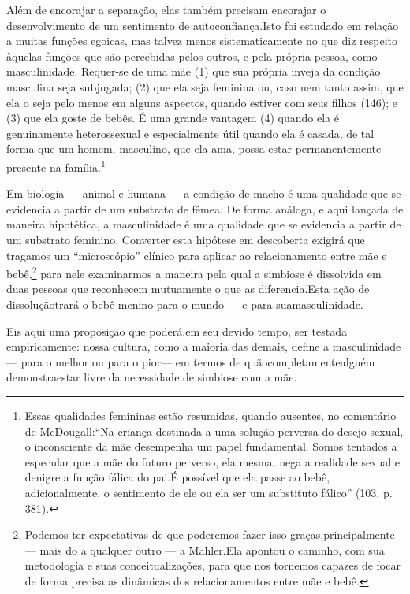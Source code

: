 Além de encorajar a separação, elas também precisam encorajar o
desenvolvimento de um sentimento de autoconfiança.\idxegoiauto[|(] Isto foi estudado em
relação a muitas funções egoicas, mas talvez menos sistematicamente no
que diz respeito àquelas funções que são percebidas pelos outros, e
pela própria pessoa, como masculinidade. Requer-se de uma mãe (1) que
sua própria inveja da condição masculina seja subjugada; (2) que ela
seja feminina\idxmascufem{} ou, caso nem tanto assim, que ela o seja pelo menos em
alguns aspectos, quando estiver com seus filhos (146); e (3) que ela
goste de bebês. É uma grande vantagem (4) quando ela é genuinamente
heterossexual e especialmente útil quando ela é casada, de tal forma
que um homem, masculino, que ela ama, possa estar permanentemente
presente na família.\footnote{ Essas qualidades femininas estão
resumidas, quando ausentes, no comentário de McDougall:\idxmcdoug[|nn]
``Na criança destinada a uma solução perversa do desejo
sexual, o inconsciente da mãe desempenha um papel fundamental. Somos
tentados a especular que a mãe do futuro perverso, ela mesma, nega a
realidade sexual e denigre a função fálica do pai.\idxmaesfalo[|nn] É possível que ela
passe ao bebê, adicionalmente, o sentimento de ele ou ela ser um
substituto fálico''\idxmaesfalo{} (103, p.\,381).}

Em biologia --- animal e humana --- a condição de macho é uma
qualidade que se evidencia a partir de um substrato de fêmea. De forma
análoga, e aqui lançada de maneira hipotética, a masculinidade é uma
qualidade que se evidencia a partir de um substrato feminino. Converter
esta hipótese em descoberta exigirá que tragamos um
``microscópio'' clínico para aplicar ao
relacionamento entre mãe e bebê,\footnote{ Podemos ter expectativas de
que poderemos fazer isso graças,\idxmaessimb[|nn] principalmente --- mais do a
qualquer outro --- a Mahler.\idxmahle[|nn] Ela apontou o caminho, com sua
metodologia e suas conceitualizações, para que nos tornemos capazes de
focar de forma precisa as dinâmicas dos relacionamentos entre mãe e
bebê.} para nele examinarmos a maneira pela qual a simbiose é
dissolvida em duas pessoas que reconhecem mutuamente o que as
diferencia.\idxinfanego[|)] Esta ação de dissolução\idxegoi[|)] trará o bebê menino para o mundo
--- e para sua\idxegoiauto[|)] masculinidade.

Eis aqui uma proposição que poderá,\idxmaesproc[|)] em seu devido tempo, ser testada
empiricamente: nossa cultura, como a maioria das demais, define a
masculinidade --- para o melhor ou para o pior\idxtranse[|)] --- em termos de quão\idxangus[|)]
completamente\idxangusimb[|)] alguém demonstra\idxmaessimb[|)] estar livre da necessidade de simbiose
com a mãe.



